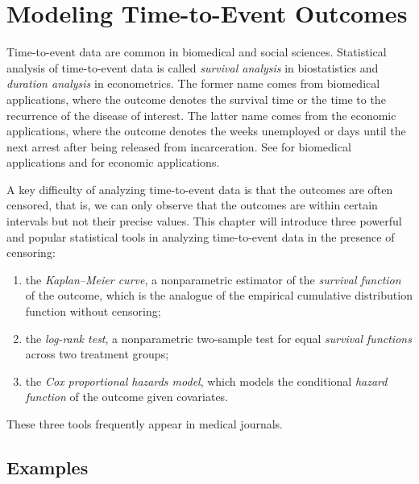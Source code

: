 

\chapter{Modeling Time-to-Event Outcomes}
 \label{chapter::survival-analysis}



Time-to-event data are common in biomedical and social sciences. Statistical analysis of time-to-event data is called
{\it survival analysis} in biostatistics and {\it duration analysis} in econometrics.
The former name comes from biomedical applications, where the outcome
denotes the survival time or the time to the recurrence of the disease of interest. The
latter name comes from the economic applications, where the outcome
denotes the weeks unemployed or days until the next arrest after being released from incarceration. See \citet{kalbfleisch2011statistical} for biomedical applications and \citet{heckman1984econometric} for economic applications. 

 

A key difficulty of analyzing time-to-event data is that the outcomes are often censored, that is, we can only observe that the outcomes are within certain intervals but not their precise values.  This chapter will introduce three powerful and popular statistical tools in analyzing time-to-event data in the presence of censoring:
\begin{enumerate}[label=(T\arabic*), ref=T\arabic*]
\item
the {\it Kaplan--Meier curve},  a nonparametric estimator of the {\it survival function} of the outcome, which is the analogue of the empirical cumulative distribution function without censoring;

\item
the {\it log-rank test}, a nonparametric two-sample test for equal {\it survival functions} across two treatment groups;

\item
the {\it Cox proportional hazards model}, which models the conditional {\it hazard function} of the outcome given covariates.
\end{enumerate}
These three tools frequently appear in medical journals. 



\section{Examples}

